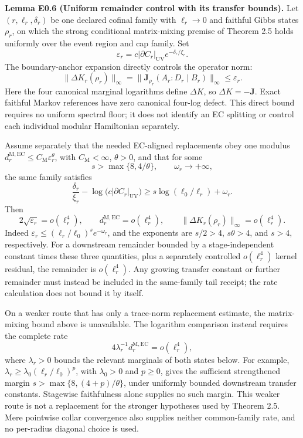\textbf{Lemma E0.6 (Uniform remainder control with its transfer bounds).}
Let \((r,\ell_r,\delta_r)\) be one declared cofinal family with
\(\ell_r\to0\) and faithful Gibbs states \(\rho_r\), on which the strong conditional matrix-mixing premise
of Theorem 2.5 holds uniformly over the event region and cap family. Set
\[
\varepsilon_r=c|\partial C_r|_{\mathrm{UV}}e^{-\delta_r/\xi_r}.
\]
The boundary-anchor expansion directly controls the operator norm:
\[
\|\Delta K_r(\rho_r)\|_\infty
=\|\mathbf J_{\rho_r}(A_r:D_r\mid B_r)\|_\infty
\le\varepsilon_r.
\]
Here the four canonical marginal logarithms define \(\Delta K\), so
\(\Delta K=-\mathbf J\). Exact faithful Markov references have zero canonical
four-log defect. This direct bound requires no uniform spectral floor;
it does not identify an EC splitting or control each individual modular
Hamiltonian separately.

Assume separately that the needed EC-aligned replacements obey one modulus
\(d_r^{\mathrm{M,EC}}\le C_{\mathrm M}\varepsilon_r^\theta\), with
\(C_{\mathrm M}<\infty\), \(\theta>0\), and that for some
\[
s>\max\{8,4/\theta\},\qquad \omega_r\longrightarrow+\infty,
\]
the same family satisfies
\[
\frac{\delta_r}{\xi_r}
-\log\!\bigl(c|\partial C_r|_{\mathrm{UV}}\bigr)
\ge s\log(\ell_0/\ell_r)+\omega_r.
\]
Then
\[
2\sqrt{\varepsilon_r}=o(\ell_r^4),\qquad
d_r^{\mathrm{M,EC}}=o(\ell_r^4),\qquad
\|\Delta K_r(\rho_r)\|_\infty=o(\ell_r^4).
\]
Indeed \(\varepsilon_r\le(\ell_r/\ell_0)^s e^{-\omega_r}\), and the
exponents are \(s/2>4\), \(s\theta>4\), and \(s>4\), respectively.
For a downstream remainder bounded by a stage-independent constant times
these three quantities, plus a separately controlled \(o(\ell_r^4)\)
kernel residual, the remainder is \(o(\ell_r^4)\). Any growing
transfer constant or further remainder must instead be included in the
same-family tail receipt; the rate calculation does not bound it by itself.

On a weaker route that has only a trace-norm replacement estimate, the
matrix-mixing bound above is unavailable. The logarithm comparison instead
requires the complete rate
\[
4\lambda_r^{-1}d_r^{\mathrm{M,EC}}=o(\ell_r^4),
\]
where \(\lambda_r>0\) bounds the relevant marginals of both states below.
For example, \(\lambda_r\ge\lambda_0(\ell_r/\ell_0)^p\), with
\(\lambda_0>0\) and \(p\ge0\), gives the sufficient strengthened margin
\(s>\max\{8,(4+p)/\theta\}\), under uniformly bounded downstream
transfer constants. Stagewise faithfulness alone supplies no such margin.
This weaker route is not a replacement for the stronger hypotheses
used by Theorem 2.5. Mere pointwise collar convergence also supplies neither
common-family rate, and no per-radius diagonal choice is used.

